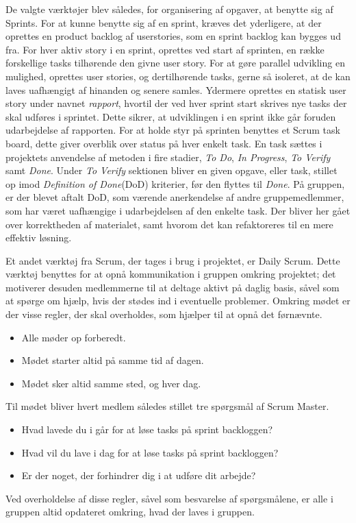 De valgte værktøjer blev således, for organisering af opgaver, at benytte sig af Sprints.
For at kunne benytte sig af en sprint, kræves det yderligere, at der oprettes en product backlog af userstories, som en sprint backlog kan bygges ud fra.
For hver aktiv story i en sprint, oprettes ved start af sprinten, en række forskellige tasks tilhørende den givne user story.
For at gøre parallel udvikling en mulighed, oprettes user stories, og dertilhørende tasks, gerne så isoleret, at de kan laves uafhængigt af hinanden og senere samles.
Ydermere oprettes en statisk user story under navnet \textit{rapport}, hvortil der ved hver sprint start skrives nye tasks der skal udføres i sprintet. 
Dette sikrer, at udviklingen i en sprint ikke går foruden udarbejdelse af rapporten.
For at holde styr på sprinten benyttes et Scrum task board, dette giver overblik over status på hver enkelt task.
En task sættes i projektets anvendelse af metoden i fire stadier, \textit{To Do}, \textit{In Progress}, \textit{To Verify} samt \textit{Done}.
Under \textit{To Verify} sektionen bliver en given opgave, eller task, stillet op imod \textit{Definition of Done}(DoD) kriterier, før den flyttes til \textit{Done}.
På gruppen, er der blevet aftalt DoD, som værende anerkendelse af andre gruppemedlemmer, som har været uafhængige i udarbejdelsen af den enkelte task.
Der bliver her gået over korrektheden af materialet, samt hvorom det kan refaktoreres til en mere effektiv løsning.

Et andet værktøj fra Scrum, der tages i brug i projektet, er Daily Scrum.
Dette værktøj benyttes for at opnå kommunikation i gruppen omkring projektet; det motiverer desuden medlemmerne til at deltage aktivt på daglig basis, såvel som at spørge om hjælp, hvis der stødes ind i eventuelle problemer.
Omkring mødet er der visse regler, der skal overholdes, som hjælper til at opnå det førnævnte.
\begin{itemize}
  \item Alle møder op forberedt.
  \item Mødet starter altid på samme tid af dagen.
  \item Mødet sker altid samme sted, og hver dag.
\end{itemize}
Til mødet bliver hvert medlem således stillet tre spørgsmål af Scrum Master.
\begin{itemize}
  \item Hvad lavede du i går for at løse tasks på sprint backloggen?
  \item Hvad vil du lave i dag for at løse tasks på sprint backloggen?
  \item Er der noget, der forhindrer dig i at udføre dit arbejde?
\end{itemize}
Ved overholdelse af disse regler, såvel som besvarelse af spørgsmålene, er alle i gruppen altid opdateret omkring, hvad der laves i gruppen.

